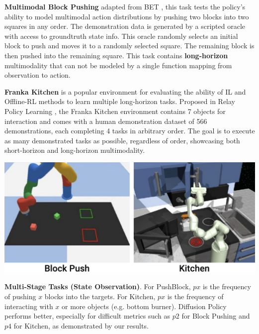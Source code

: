 \textbf{Multimodal Block Pushing} adapted from BET \cite{bet}, this task tests the policy's ability to model multimodal action distributions by pushing two blocks into two squares in any order. The demonstration data is generated by a scripted oracle with access to groundtruth state info. This oracle randomly selects an initial block to push and moves it to a randomly selected square. The remaining block is then pushed into the remaining square. This task contains \textbf{long-horizon} multimodality that can not be modeled by a single function mapping from observation to action.

\textbf{Franka Kitchen} is a popular environment for evaluating the ability of IL and Offline-RL methods to learn multiple long-horizon tasks. Proposed in Relay Policy Learning \cite{gupta2019relay}, the Franka Kitchen environment contains 7 objects for interaction and comes with a human demonstration dataset of 566 demonstrations, each completing 4 tasks in arbitrary order. The goal is to execute as many demonstrated tasks as possible, regardless of order, showcasing both short-horizon and long-horizon multimodality.

\begin{table}[t]
\centering
\includegraphics[width=0.9\linewidth]{figure/multitask_thumbnails.pdf}

\vspace{2mm}

\caption{\textbf{Multi-Stage Tasks (State Observation)}. 
\label{tab:multi_stage}
For PushBlock, $px$ is the frequency of pushing $x$ blocks into the targets. 
For Kitchen, $px$ is the frequency of interacting with $x$ or more objects (e.g. bottom burner). 
Diffusion Policy performs better, especially for difficult metrics such as $p2$ for Block Pushing and $p4$ for Kitchen, as demonstrated by our results.
}
\vspace{-4mm}
\end{table}

